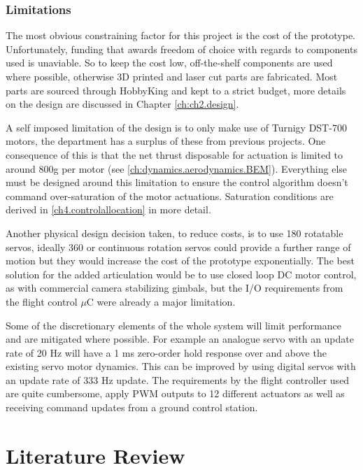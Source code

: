 \subsubsection{Limitations}
\label{subsubsec:intro.foreward.limits}
The most obvious constraining factor for this project is the cost of the prototype. Unfortunately, funding that awards freedom of choice with regards to components used is unaviable. So to keep the cost low, off-the-shelf components are used where possible, otherwise 3D printed and laser cut parts are fabricated. Most parts are sourced through HobbyKing \cite{hobbyking} and kept to a strict budget, more details on the design are discussed in Chapter \ref{ch:ch2.design}.
\par
A self imposed limitation of the design is to only make use of Turnigy DST-700 motors, the department has a surplus of these from previous projects. One consequence of this is that the net thrust disposable for actuation is limited to around 800g per motor (see \ref{ch:dynamics.aerodynamics.BEM}). Everything else must be designed around this limitation to ensure the control algorithm doesn't command over-saturation of the motor actuations. Saturation conditions are derived in \ref{ch4.controlallocation} in more detail.
\par
Another physical design decision taken, to reduce costs, is to use 180 \textdegree rotatable servos, ideally 360 \textdegree or continuous rotation servos could provide a further range of motion but they would increase the cost of the prototype exponentially. The best solution for the added articulation would be to use closed loop DC motor control, as with commercial camera stabilizing gimbals, but the I/O requirements from the flight control $\mu$C were already a major limitation.
\par
Some of the discretionary elements of the whole system will limit performance and are mitigated where possible. For example an analogue servo with an update rate of 20 Hz will have a 1 ms zero-order hold response over and above the existing servo motor dynamics. This can be improved by using digital servos with an update rate of 333 Hz update. The requirements by the flight controller used are quite cumbersome, apply PWM outputs to 12 different actuators as well as receiving command updates from a ground control station. 
\section{Literature Review}
\label{sec:intro.litreview}
